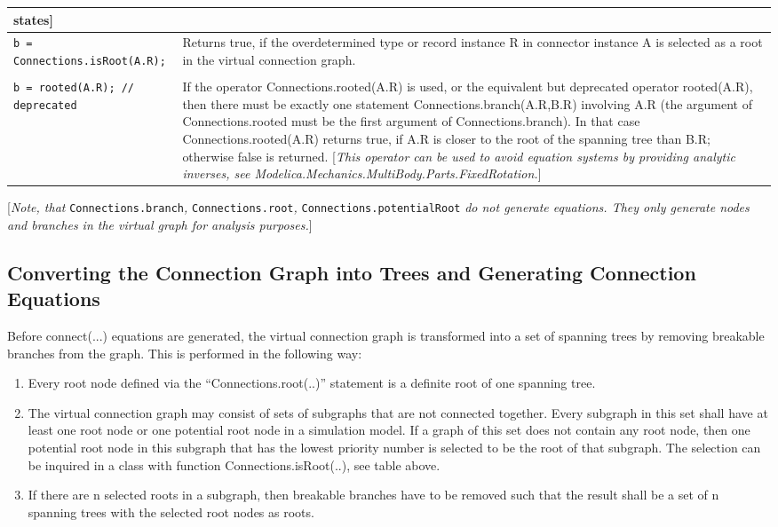 \begin{longtable}[]{|p{5.1cm}|p{10cm}|}
{states}{]}
\\ \hline
\lstinline!b = Connections.isRoot(A.R);! & Returns true, if the overdetermined type
or record instance R in connector instance A is selected as a root in
the virtual connection graph.\\ \hline
\begin{tabular}{@{}p{5.1cm}@{}}
\lstinline!b = Connections.rooted(A.R);!\\
\lstinline!b = rooted(A.R); // deprecated!
\end{tabular}
& If the operator Connections.rooted(A.R)
is used, or the equivalent but deprecated operator rooted(A.R), then
there must be exactly one statement Connections.branch(A.R,B.R)
involving A.R (the argument of Connections.rooted must be the first
argument of Connections.branch). In that case Connections.rooted(A.R)
returns true, if A.R is closer to the root of the spanning tree than
B.R; otherwise false is returned. {[}\emph{This operator can be used to
avoid equation systems by providing analytic inverses, see
Modelica.Mechanics.MultiBody.Parts.FixedRotation.}{]}\\ \hline
\end{longtable}

{[}\emph{Note, that} \lstinline!Connections.branch!\emph{,} \lstinline!Connections.root!\emph{,}
\lstinline!Connections.potentialRoot! \emph{do not generate equations. They only
generate nodes and branches in the virtual graph for analysis
purposes.}{]}

\subsection{Converting the Connection Graph into Trees and Generating Connection Equations}

Before connect(...) equations are generated, the virtual connection
graph is transformed into a set of spanning trees by removing breakable
branches from the graph. This is performed in the following way:

\begin{enumerate}
\item
  Every root node defined via the ``Connections.root(..)'' statement is
  a definite root of one spanning tree.
\item
  The virtual connection graph may consist of sets of subgraphs that are
  not connected together. Every subgraph in this set shall have at least
  one root node or one potential root node in a simulation model. If a
  graph of this set does not contain any root node, then one potential
  root node in this subgraph that has the lowest priority number is
  selected to be the root of that subgraph. The selection can be
  inquired in a class with function Connections.isRoot(..), see table
  above.
\item
  If there are n selected roots in a subgraph, then breakable branches
  have to be removed such that the result shall be a set of n spanning
  trees with the selected root nodes as roots.
\end{enumerate}

